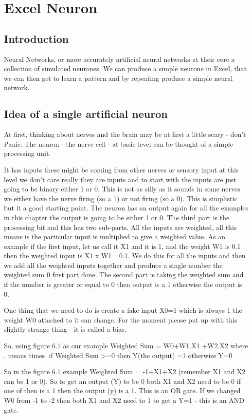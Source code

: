 \chapter{Excel Neuron}
\section{Introduction}
Neural Networks, or more accurately artificial neural networks at their core a collection of simulated neurones. We can produce a simple neurone in Excel, that we can then get to learn a pattern and by repeating produce a simple neural network.

\section{Idea of a single artificial neuron}
At first, thinking about nerves and the brain may be at first a little scary - don't Panic. The neuron - the nerve cell - at basic level can be thought of a simple processing unit.

It has inputs these might be coming from other nerves or sensory input at this level we don't care really they are inputs and to start with the inputs are just going to be binary either 1 or 0. This is not as silly as it sounds in some nerves we either have the nerve firing (so a 1) or not firing (so a 0). This is simplistic but it a good starting point.
The neuron has an output again for all the examples in this chapter the output is going to be either 1 or 0.
The third part is the processing bit and this has two sub-parts. All the inputs are weighted, all this means is the particular input is multiplied to give a weighted value. As an example if the first input, let us call it X1 and it is 1, and the weight W1 is 0.1 then the weighted input is X1 x W1 =0.1. We do this for all the inputs and then we add all the weighted inputs together and produce a single number the weighted sum 0 first part done. The second part is taking the weighted sum and if the number is greater or equal to 0 then output is a 1 otherwise the output is 0.

One thing that we need to do is create a fake input X0=1 which is always 1 the weight W0 attached to it can change. For the moment please put up with this slightly strange thing - it is called a bias.

So, using figure 6.1 as our example
Weighted Sum = W0+W1.X1 +W2.X2 where . means times.
if Weighted Sum >=0 then Y(the output) =1 otherwise Y=0

So in the figure 6.1 example Weighted Sum = -1+X1+X2 (remember X1 and X2 can be 1 or 0). So to get an output (Y) to be 0 both X1 and X2 need to be 0 if one of then is a 1 then the output (y) is a 1. This is an OR gate. If we changed W0 from -1 to -2 then both X1 and X2 need to 1 to get a Y=1 - this is an AND gate.

